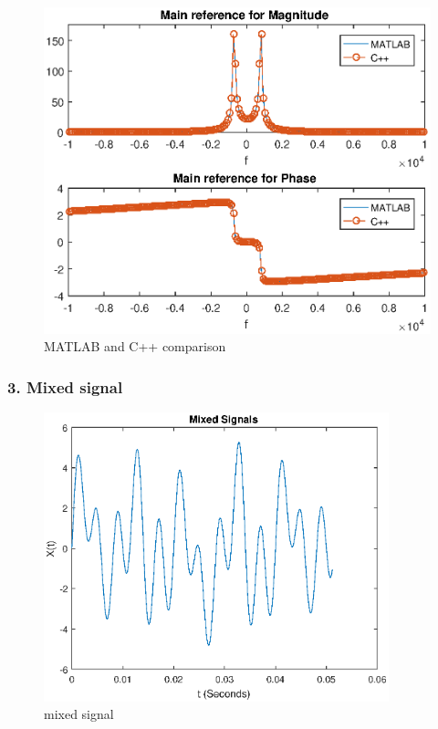 \begin{figure}[h]
	\centering
	\includegraphics[width=12cm]{./algorithms/fft/figures/Single_sinusoid_fft.eps}
	\caption{MATLAB and C++ comparison}\label{Single_sinusoid_fft}
\end{figure}

\newpage
\subsubsection{3. Mixed signal}

\begin{figure}[h]
	\centering
	\includegraphics[width=10cm]{./algorithms/fft/figures/mixed_signal.eps}
	\caption{mixed signal}\label{mixed_signal}
\end{figure}


